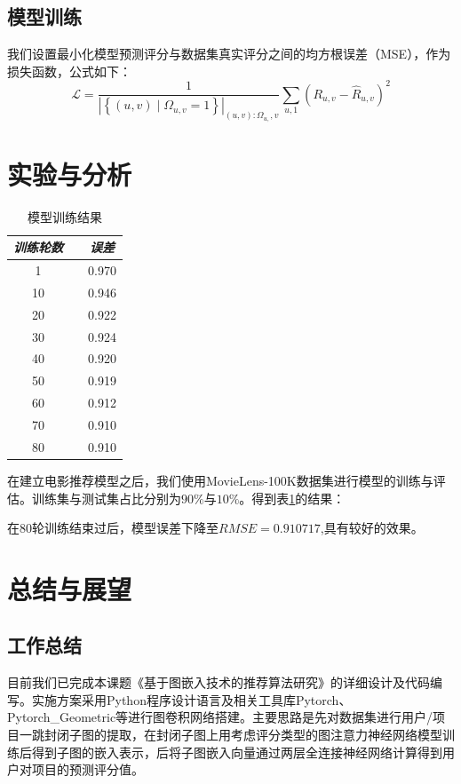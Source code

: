 \documentclass{ctexart}
\begin{document}
\subsection{模型训练}
我们设置最小化模型预测评分与数据集真实评分之间的均方根误差（MSE），作为损失函数，公式如下：
\begin{equation}
    \mathcal{L}=\frac{1}{\left|\left\{(u, v) \mid \Omega_{u, v}=1\right\}\right|_{(u, v): \Omega_{u,}, v}} \sum_{u, 1}\left(R_{u, v}-\widehat{R}_{u, v}\right)^{2}
\label{}
\end{equation}
\section{实验与分析}

\begin{table}[t]
    \centering
    \begin{tabular}{ccc}
    \toprule
    \multicolumn{1}{c}{\textit{训练轮数}}
      &&\multicolumn{1}{c}{\textit{误差}}  \\ \midrule
    1	&&0.970\\
    10	&&0.946\\
    20	&&0.922\\
    30	&&0.924\\
    40	&&0.920\\
    50	&&0.919\\
    60	&&0.912\\
    70	&&0.910\\
    80	&&0.910\\
    \bottomrule
      \end{tabular}
    \caption{模型训练结果}
    \label{tabula}
    \end{table}

在建立电影推荐模型之后，我们使用MovieLens-100K数据集进行模型的训练与评估。训练集与测试集占比分别为$90\%$与$10\%$。得到表\ref{tabula}的结果：

在80轮训练结束过后，模型误差下降至$RMSE=0.910717$,具有较好的效果。

\section{总结与展望}
\subsection{工作总结}

目前我们已完成本课题《基于图嵌入技术的推荐算法研究》的详细设计及代码编写。实施方案采用Python程序设计语言及相关工具库Pytorch、Pytorch\_Geometric等进行图卷积网络搭建。主要思路是先对数据集进行用户/项目一跳封闭子图的提取，在封闭子图上用考虑评分类型的图注意力神经网络模型训练后得到子图的嵌入表示，后将子图嵌入向量通过两层全连接神经网络计算得到用户对项目的预测评分值。
\end{document}
